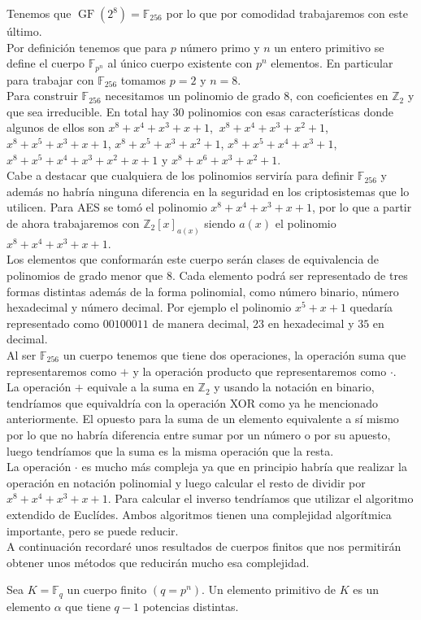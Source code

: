 Tenemos que $\operatorname{GF}(2^8)=\mathbb{F}_{256}$ por lo que por comodidad trabajaremos con este último.\\
Por definición tenemos que para $p$ número primo y $n$ un entero primitivo se define el cuerpo $\mathbb{F}_{p^n}$ al único cuerpo existente con $p^n$ elementos. En particular para trabajar con $\mathbb{F}_{256}$ tomamos $p=2$ y $n=8$.\\
Para construir $\mathbb{F}_{256}$ necesitamos un polinomio de grado 8, con coeficientes en $\mathbb{Z}_2$ y que sea irreducible. En total hay 30 polinomios con esas características donde algunos de ellos son 
$x^8+x^4+x^3+x+1$, $\:x^8+x^4+x^3+x^2+1$, $x^8+x^5+x^3+x+1$, $x^8+x^5+x^3+x^2+1$, $x^8+x^5+x^4+x^3+1$, $x^8+x^5+x^4+x^3+x^2+x+1$ y $x^8+x^6+x^3+x^2+1$.\\ 
Cabe a destacar que cualquiera de los polinomios serviría para definir $\mathbb{F}_{256}$ y además no habría ninguna diferencia en la seguridad en los criptosistemas que lo utilicen. 
Para AES se tomó el polinomio $x^8+x^4+x^3+x+1$, por lo que a partir de ahora trabajaremos con $\mathbb{Z}_2[x]_{a(x)}$ siendo $a(x)$ el polinomio $x^8+x^4+x^3+x+1$.\\
Los elementos que conformarán este cuerpo serán clases de equivalencia de polinomios  de grado menor que 8. Cada elemento podrá ser representado de tres formas distintas además de la forma polinomial, como número binario, número hexadecimal y número decimal. Por ejemplo el polinomio $x^5+x+1$ quedaría representado como $00100011$ de manera decimal, $23$ en hexadecimal y $35$ en decimal.\\
Al ser $\mathbb{F}_{256}$ un cuerpo tenemos que tiene dos operaciones, la operación suma que representaremos como $+$ y la operación producto que representaremos como $\cdot$.\\
La operación $+$ equivale a la suma en $\mathbb{Z}_2$ y usando la notación en binario, tendríamos que equivaldría con la operación XOR como ya he mencionado anteriormente. El opuesto para la suma de un elemento equivalente a sí mismo por lo que no habría diferencia entre sumar por un número o por su apuesto, luego tendríamos que la suma es la misma operación que la resta.\\
La operación $\cdot$  es mucho más compleja ya que en principio habría que realizar la operación en notación polinomial y luego calcular el resto de dividir por $x^8+x^4+x^3+x+1$. Para calcular el inverso tendríamos que utilizar el algoritmo extendido de Euclídes. Ambos algoritmos tienen una complejidad algorítmica importante, pero se puede reducir.\\
A continuación recordaré unos resultados de cuerpos finitos que nos permitirán obtener unos métodos que reducirán mucho esa complejidad.\\
\begin{definicion}
	Sea $K=\mathbb{F}_q$ un cuerpo finito $(q=p^n)$. Un elemento primitivo de $K$ es un elemento $\alpha$ que tiene $q-1$ potencias distintas.
\end{definicion}

